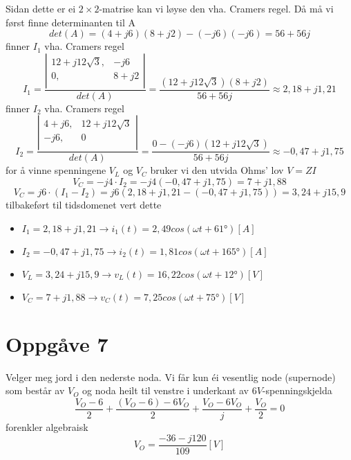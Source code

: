 \documentclass[12pt,a4paper]{article}
\begin{document}
    Sidan dette er ei $2\times2$-matrise kan vi løyse den vha. Cramers regel. Då må vi først
    finne determinanten til A
    \begin{equation}
      det(A) = (4+j6)(8+j2)-(-j6)(-j6) = 56+56j
    \end{equation}
    finner $I_1$ vha. Cramers regel
    \begin{equation}
      I_1 = \frac{
        \left| \begin{array}{cc}
          12+j12\sqrt{3}, & -j6 \\
          0,              & 8+j2 \\
        \end{array} \right|}
      {det(A)} =
      \frac{(12+j12\sqrt{3})(8+j2)}{56+56j} \approx 2,18 + j1,21
    \end{equation}
    finner $I_2$ vha. Cramers regel
    \begin{equation}
      I_2 = \frac{
        \left| \begin{array}{cc}
          4+j6, & 12+j12\sqrt{3} \\
          -j6,  & 0 \\
        \end{array} \right|}
      {det(A)} =
      \frac{0-(-j6)(12+j12\sqrt{3})}{56+56j} \approx -0,47 + j1,75
    \end{equation}
    for å vinne spenningene $V_L$ og $V_C$ bruker vi den utvida Ohms' lov $V=ZI$
    \begin{equation}
      V_C = -j4 \cdot I_2 = -j4(-0,47 + j1,75) = 7 + j1,88
    \end{equation}
    \begin{equation}
      V_C = j6 \cdot (I_1 - I_2) = j6(2,18+j1,21 - (-0,47 +j1,75)) = 3,24 + j15,9
    \end{equation}
    tilbakeført til tidsdomenet vert dette
    \begin{itemize}
      \item $I_1 = 2,18+j1,21 \longrightarrow i_1(t) = 2,49cos(\omega t + \ang{61}) [A]$
      \item $I_2 = -0,47+j1,75 \longrightarrow i_2(t) = 1,81cos(\omega t + \ang{165}) [A]$
      \item $V_L = 3,24+j15,9 \longrightarrow v_L(t) = 16,22cos(\omega t + \ang{12}) [V]$
      \item $V_C = 7+j1,88 \longrightarrow v_C(t) = 7,25cos(\omega t + \ang{75}) [V]$
    \end{itemize}


  \section*{Oppgåve 7}
    Velger meg jord i den nederste noda. Vi får kun éi vesentlig node (supernode) som
    består av $V_O$ og noda heilt til venstre i underkant av $6V$-spenningskjelda
    \begin{equation}
      \frac{V_O - 6}{2} + \frac{(V_O - 6) - 6V_O}{2} + \frac{V_O - 6V_O}{j} + \frac{V_O}{2} = 0
    \end{equation}
    forenkler algebraisk
    \begin{equation}
      V_O = \frac{-36 - j120}{109}[V]
    \end{equation}
\end{document}
